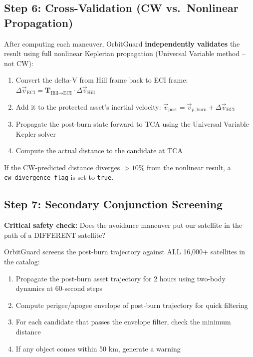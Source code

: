 \documentclass[12pt,a4paper]{article}
\begin{document}
\subsection{Step 6: Cross-Validation (CW vs.\ Nonlinear Propagation)}

After computing each maneuver, OrbitGuard \textbf{independently validates} the result using full nonlinear Keplerian propagation (Universal Variable method -- not CW):

\begin{enumerate}
    \item Convert the delta-V from Hill frame back to ECI frame: $\Delta\vec{v}_{\text{ECI}} = \mathbf{T}_{\text{Hill}\to\text{ECI}} \cdot \Delta\vec{v}_{\text{Hill}}$
    \item Add it to the protected asset's inertial velocity: $\vec{v}_{\text{post}} = \vec{v}_{p,\text{burn}} + \Delta\vec{v}_{\text{ECI}}$
    \item Propagate the post-burn state forward to TCA using the Universal Variable Kepler solver
    \item Compute the actual distance to the candidate at TCA
\end{enumerate}

If the CW-predicted distance diverges $> 10\%$ from the nonlinear result, a \texttt{cw\_divergence\_flag} is set to \texttt{true}.

\subsection{Step 7: Secondary Conjunction Screening}

\textbf{Critical safety check:} Does the avoidance maneuver put our satellite in the path of a DIFFERENT satellite?

OrbitGuard screens the post-burn trajectory against ALL 16,000+ satellites in the catalog:
\begin{enumerate}
    \item Propagate the post-burn asset trajectory for 2 hours using two-body dynamics at 60-second steps
    \item Compute perigee/apogee envelope of post-burn trajectory for quick filtering
    \item For each candidate that passes the envelope filter, check the minimum distance
    \item If any object comes within 50 km, generate a warning
\end{enumerate}
\end{document}
